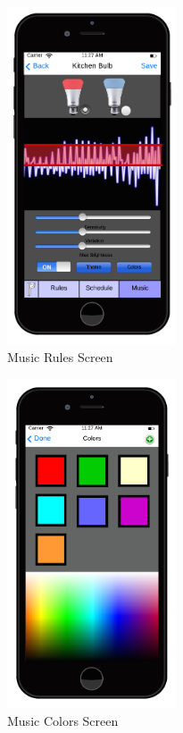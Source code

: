 \documentclass[12pt]{article}
\begin{document}
  \begin{figure}[ht!]
    \centering
    \includegraphics[width=50mm]{iPhone_music_main.png}
    \caption{Music Rules Screen}
    \label{fig:musicRules}
  \end{figure}
  
  \begin{figure}[ht!]
    \centering
    \includegraphics[width=50mm]{iPhone_music_color.png}
    \caption{Music Colors Screen}
    \label{fig:musicColors}
  \end{figure}
  
  
  
  
  
  
  
  
  
  
  
  
  
  
  

  
  
  
  
  
\end{document}
